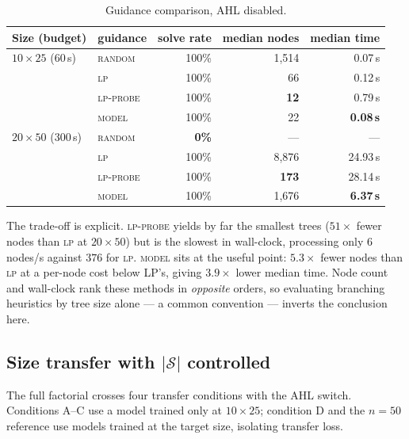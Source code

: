 \documentclass[12pt]{article}
\begin{document}
\begin{table}[h]
\centering
\begin{tabular}{llrrr}
\toprule
Size (budget) & guidance & solve rate & median nodes & median time \\
\midrule
$10\times25$ (60\,s) & \textsc{random} & 100\% & 1{,}514 & 0.07\,s \\
 & \textsc{lp} & 100\% & 66 & 0.12\,s \\
 & \textsc{lp-probe} & 100\% & \textbf{12} & 0.79\,s \\
 & \textsc{model} & 100\% & 22 & \textbf{0.08\,s} \\
\midrule
$20\times50$ (300\,s) & \textsc{random} & \textbf{0\%} & --- & --- \\
 & \textsc{lp} & 100\% & 8{,}876 & 24.93\,s \\
 & \textsc{lp-probe} & 100\% & \textbf{173} & 28.14\,s \\
 & \textsc{model} & 100\% & 1{,}676 & \textbf{6.37\,s} \\
\bottomrule
\end{tabular}
\caption{Guidance comparison, AHL disabled.}
\label{tab:search}
\end{table}

The trade-off is explicit. \textsc{lp-probe} yields by far the smallest trees ($51\times$ fewer nodes than \textsc{lp} at $20\times50$) but is the slowest in wall-clock, processing only $6$ nodes/s against $376$ for \textsc{lp}. \textsc{model} sits at the useful point: $5.3\times$ fewer nodes than \textsc{lp} at a per-node cost below LP's, giving $3.9\times$ lower median time. Node count and wall-clock rank these methods in \emph{opposite} orders, so evaluating branching heuristics by tree size alone --- a common convention --- inverts the conclusion here.

\subsection{Size transfer with $|\mathcal{S}|$ controlled}
\label{sec:transfer}

The full factorial crosses four transfer conditions with the AHL switch. Conditions A--C use a model trained only at $10\times25$; condition D and the $n=50$ reference use models trained at the target size, isolating transfer loss.
\end{document}
